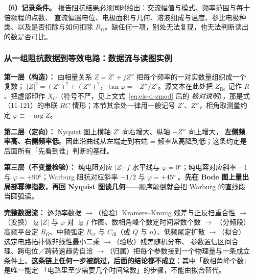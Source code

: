 \begin{measure}
\textbf{（6）记录条件。} 报告阻抗结果必须同时给出：交流幅值与模式、频率范围与每十倍频程的点数、
直流偏置电位、电极面积与几何、溶液组成与温度、参比电极种类、以及是否扣除与如何扣除
$R_{\Omega}$。缺任何一项，别处无法复现，也无法判断读出的数是否可比。
\end{measure}

\subsubsection{从一组阻抗数据到等效电路：数据流与读图实例}

\begin{dataflow}
\textbf{第一层（构造）：} 由相量关系 $Z=Z'+jZ''$ 把每个频率的一对实数量组织成一个复数；
$|Z|^{2}=(Z')^{2}+(Z'')^{2}$，$\tan\varphi=-Z''/Z'$。源文本在此处把 $Z_{\mathrm{Re}}$ 记作 $R$、把虚部印作
$X_C$（符号不严，见上文式~\eqref{eq:eis-d-zmod} 后的 \emph{核对说明}），那是式（11-121）的串联 $RC$
情形；本节其余处一律用一般记号 $Z'$、$Z''$，相角取测量约定 $\varphi\equiv-\arg Z$。

\textbf{第二层（定向）：} Nyquist 图上横轴 $Z'$ 向右增大、纵轴 $-Z''$ 向上增大，
\textbf{左侧频率高、右侧频率低}。因此沿曲线从左端走到右端 =
频率从高降到低；这条约定是后面所有「先看到谁」判断的基础。

\textbf{第三层（不变量检验）：} 纯电阻对应 $|Z|$–$f$ 水平线与 $\varphi=0$°；纯电容对应斜率
$-1$ 与 $\varphi=+90$°；Warburg 阻抗对应斜率 $-1/2$ 与 $\varphi=+45$°
。\textbf{先在 Bode 图上量出局部幂律指数，再回 Nyquist
图谈几何}——顺序颠倒就会把 Warburg 的直线段当圆弧读。

\textbf{完整数据流：} 逐频率数据 $\to$（检验）Kramers--Kronig 残差与正反扫重合性 $\to$
（变换）$\lg\lvert Z\rvert$ 与 $\varphi$ 对 $\lg f$ 作图、数相角峰个数定时间常数个数 $\to$
（分频段）高频平台定 $R_{\Omega}$、中频弧定 $R_{\mathrm{ct}}$ 与 $C_{\mathrm{dl}}$（或 $Q$ 与
$n$）、低频尾定扩散 $\to$（拟合）选定电路拓扑做非线性最小二乘 $\to$（验收）残差随机分布、
参数置信区间合理、跨电位／跨转速趋势自洽 $\to$（归属）把每个参数接到一个物理量与一条成立
条件上。\textbf{这条链上任何一步被跳过，后面的结论都不成立}；其中「数相角峰个数」是唯一能定
「电路里至少需要几个时间常数」的步骤，不能由拟合替代。
\end{dataflow}

